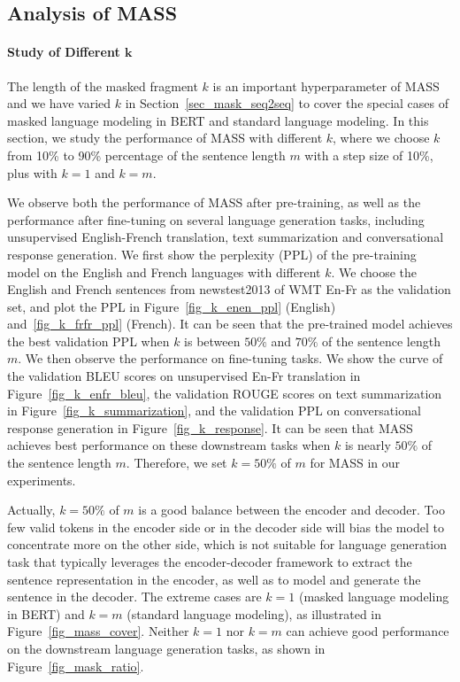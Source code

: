 \documentclass{article}
\begin{document}
	\subsection{Analysis of MASS}
	
	\paragraph{Study of Different $\mathbf{k}$} The length of the masked fragment $k$ is an important hyperparameter of MASS and we have varied $k$ in Section~\ref{sec_mask_seq2seq} to cover the special cases of masked language modeling in BERT and standard language modeling. In this section, we study the performance of MASS with different $k$, where we choose $k$ from 10\% to 90\% percentage of the sentence length $m$ with a step size of 10\%, plus with $k=1$ and $k=m$.
	
	We observe both the performance of MASS after pre-training, as well as the performance after fine-tuning on several language generation tasks, including unsupervised English-French translation, text summarization and conversational response generation. We first show the perplexity (PPL) of the pre-training model on the English and French languages with different $k$. We choose the English and French sentences from newstest2013 of WMT En-Fr as the validation set, and plot the PPL in  Figure~\ref{fig_k_enen_ppl} (English) and~\ref{fig_k_frfr_ppl} (French). It can be seen that the pre-trained model achieves the best validation PPL when $k$ is between $50\%$ and $70\%$ of the sentence length $m$. We then observe the performance on fine-tuning tasks. We show the curve of the validation BLEU scores on unsupervised En-Fr translation in Figure~\ref{fig_k_enfr_bleu}, the validation ROUGE scores on text summarization in Figure~\ref{fig_k_summarization}, and the validation PPL on conversational response generation in Figure~\ref{fig_k_response}. It can be seen that MASS achieves best performance on these downstream tasks when $k$ is nearly $50\%$ of the sentence length $m$. Therefore, we set $k=50\%$ of $m$ for MASS in our experiments.
	
	Actually, $k=50\%$ of $m$ is a good balance between the encoder and decoder. Too few valid tokens in the encoder side or in the decoder side will bias the model to concentrate more on the other side, which is not suitable for language generation task that typically leverages the encoder-decoder framework to extract the sentence representation in the encoder, as well as to model and generate the sentence in the decoder. The extreme cases are $k=1$ (masked language modeling in BERT) and $k=m$ (standard language modeling), as illustrated in Figure~\ref{fig_mass_cover}. Neither $k=1$ nor $k=m$ can achieve good performance on the downstream language generation tasks, as shown in Figure~\ref{fig_mask_ratio}. 
	
\end{document}
